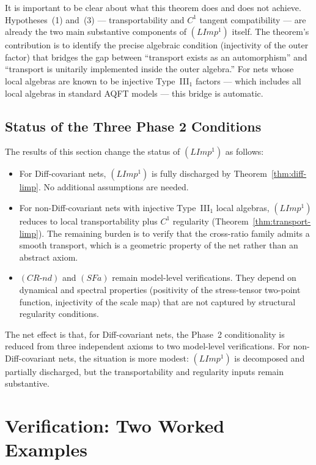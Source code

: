 \documentclass[12pt]{article}
\theoremstyle{definition}
\theoremstyle{remark}
\begin{document}
It is important to be clear about what this theorem does and does not achieve. Hypotheses~(1) and~(3) — transportability and $C^1$ tangent compatibility — are already the two main substantive components of $(LImp^1)$ itself. The theorem's contribution is to identify the precise algebraic condition (injectivity of the outer factor) that bridges the gap between ``transport exists as an automorphism'' and ``transport is unitarily implemented inside the outer algebra.'' For nets whose local algebras are known to be injective Type~III$_1$ factors — which includes all local algebras in standard AQFT models — this bridge is automatic.

\subsection{Status of the Three Phase 2 Conditions}\label{status-phase2-conditions}

The results of this section change the status of $(LImp^1)$ as follows:

\begin{itemize}
\item For Diff-covariant nets, $(LImp^1)$ is fully discharged by Theorem~\ref{thm:diff-limp}. No additional assumptions are needed.
\item For non-Diff-covariant nets with injective Type~III$_1$ local algebras, $(LImp^1)$ reduces to local transportability plus $C^1$ regularity (Theorem~\ref{thm:transport-limp}). The remaining burden is to verify that the cross-ratio family admits a smooth transport, which is a geometric property of the net rather than an abstract axiom.
\item $(CR\text{-}nd)$ and $(SFa)$ remain model-level verifications. They depend on dynamical and spectral properties (positivity of the stress-tensor two-point function, injectivity of the scale map) that are not captured by structural regularity conditions.
\end{itemize}

The net effect is that, for Diff-covariant nets, the Phase~2 conditionality is reduced from three independent axioms to two model-level verifications. For non-Diff-covariant nets, the situation is more modest: $(LImp^1)$ is decomposed and partially discharged, but the transportability and regularity inputs remain substantive.

\section{Verification: Two Worked
Examples}\label{verification-two-worked-examples}
\end{document}
